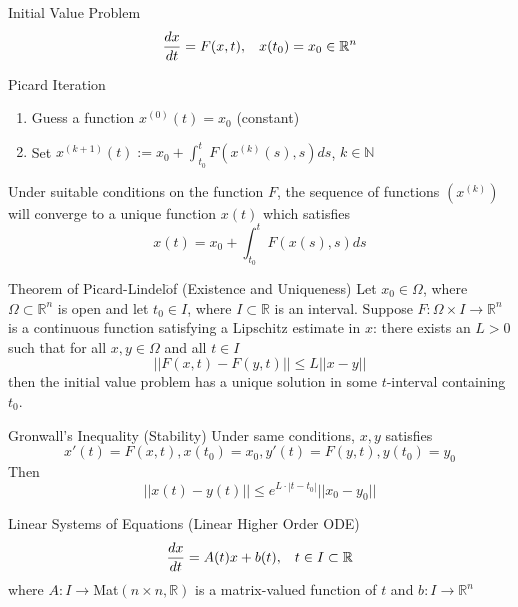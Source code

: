 \documentclass{beamer}
\begin{document}
\begin{frame}
\begin{block}{Initial Value Problem}
$$\dfrac{dx}{dt}=F(x,t),\hspace{3mm}x(t_0)=x_0\in\mathbb{R}^n$$
\end{block}
\begin{block}{Picard Iteration}
\begin{enumerate}
\item Guess a function $x^{(0)}(t)=x_0$ (constant)
\item Set $x^{(k+1)}(t):=x_0+\int_{t_0}^tF(x^{(k)}(s),s)ds$, $k\in\mathbb{N}$
\end{enumerate}
Under suitable conditions on the function $F$, the sequence of functions $(x^{(k)})$ will converge to a unique function $x(t)$ which satisfies
$$x(t)=x_0+\int_{t_0}^tF(x(s),s)ds$$
\end{block}
\end{frame}

\begin{frame}
\begin{block}{Theorem of Picard-Lindel$\ddot{\text{o}}$f (Existence and Uniqueness)}
Let $x_0\in\Omega$, where $\Omega\subset\mathbb{R}^n$ is open and let $t_0\in I$, where $I\subset\mathbb{R}$ is an interval. Suppose $F:\Omega\times I\rightarrow\mathbb{R}^n$ is a continuous function satisfying a Lipschitz estimate in $x$: there exists an $L>0$ such that for all $x,y\in\Omega$ and all $t\in I$
$$||F(x,t)-F(y,t)||\leqslant L||x-y||$$
then the initial value problem has a unique solution in some $t$-interval containing $t_0$. 
\end{block}
\begin{block}{Gronwall's Inequality (Stability)}
Under same conditions, $x,y$ satisfies
$$x'(t)=F(x,t),x(t_0)=x_0,y'(t)=F(y,t),y(t_0)=y_0$$
Then
$$||x(t)-y(t)||\leqslant e^{L\cdot|t-t_0|}||x_0-y_0||$$
\end{block}
\end{frame}

\begin{frame}
\begin{block}{Linear Systems of Equations (Linear Higher Order ODE)}
$$\dfrac{dx}{dt}=A(t)x+b(t),\hspace{3mm}t\in I\subset\mathbb{R} $$
where $A: I\rightarrow$Mat$(n\times n,\mathbb{R})$ is a matrix-valued function of $t$ and $b:I\rightarrow\mathbb{R}^n$
\end{block}
\end{frame}
\end{document}

